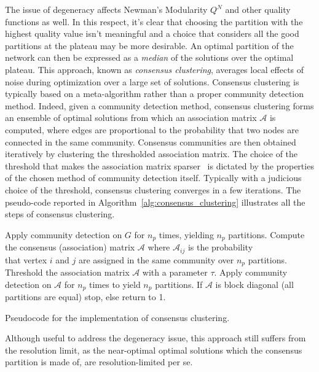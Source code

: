 The issue of degeneracy affects Newman's Modularity $Q^N$ and other quality functions as well.
In this respect, it's clear that choosing the partition with the highest quality value isn't meaningful and a choice that considers all the good partitions at the plateau may be more desirable. 
An optimal partition of the network can then be expressed as a \emph{median} of the solutions over the optimal plateau.
This approach, known as \emph{consensus clustering}, averages local effects of noise during optimization over a large set of solutions.
Consensus clustering is typically based on a meta-algorithm rather than a proper community detection method.
Indeed, given a community detection method, consensus clustering forms an ensemble of optimal solutions from which an association matrix $\mathcal{A}$ is computed, where edges are proportional to the probability that two nodes are connected in the same community. 
Consensus communities are then obtained iteratively by clustering the thresholded association matrix.
The choice of the threshold that makes the association matrix sparser~\cite{lancichinetti2012} is dictated by the properties of the chosen method of community detection itself.
Typically with a judicious choice of the threshold, consensus clustering converges in a few iterations.
The pseudo-code reported in Algorithm~\ref{alg:consensus_clustering} illustrates all the steps of consensus clustering.

\begin{Algorithm}[htb!]
\begin{codebox}
\li Apply community detection on $G$ for $n_p$ times, yielding $n_p$ partitions.
\li Compute the consensus (association) matrix $\mathcal{A}$ where $\mathcal{A}_{ij}$ is the probability \\that vertex $i$ and $j$ are assigned in the same community over $n_p$ partitions.
\li Threshold the association matrix $\mathcal{A}$ with a parameter $\tau$.
\li Apply community detection on $\mathcal{A}$ for $n_p$ times to yield $n_p$ partitions.
\li If $\mathcal{A}$ is block diagonal (all partitions are equal) stop, else return to 1.
\end{codebox}
\caption{Pseudocode for the implementation of consensus clustering.}
\label{alg:consensus_clustering}
\end{Algorithm}

Although useful to address the degeneracy issue, this approach still suffers from the resolution limit, as the near-optimal optimal solutions which the consensus partition is made of, are resolution-limited per se.


